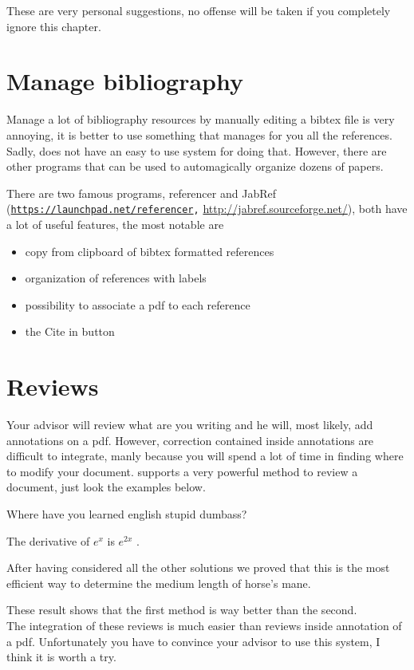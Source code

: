 These are very personal suggestions, no offense will be taken if you
completely ignore this chapter.

\section{Manage bibliography}

Manage a lot of bibliography resources by manually editing a \textsf{bibtex}
file is very annoying, it is better to use something that manages
for you all the references. Sadly, \LyX{} does not have an easy to
use system for doing that. However, there are other programs that
can be used to automagically organize dozens of papers.

There are two famous programs\textsf{, referencer} and \textsf{JabRef}
(\texttt{\url{https://launchpad.net/referencer},} \url{http://jabref.sourceforge.net/}),
both have a lot of useful features, the most notable are
\begin{itemize}
\item copy from clipboard of \textsf{bibtex} formatted references
\item organization of references with labels
\item possibility to associate a \textsf{pdf} to each reference
\item the \textsf{Cite in \LyX{} }button
\end{itemize}

\section{Reviews}

Your advisor will review what are you writing and he will, most likely,
add annotations on a \textsf{pdf}. However, correction contained inside
annotations are difficult to integrate, manly because you will spend
a lot of time in finding where to modify your document. \LyX{} supports
a very powerful method to review a document, just look the examples
below.

Where have you learned english stupid dumbass?

The derivative of $e^{x}$ is $e^{2x}$ .

After having considered all the other solutions we proved that this
is the most efficient way to determine the medium length of horse's
mane.

These result shows that the first method is way better than the second.
\\
The integration of these reviews is much easier than reviews inside
annotation of a \textsf{pdf}. Unfortunately you have to convince your
advisor to use this system, I think it is worth a try.

